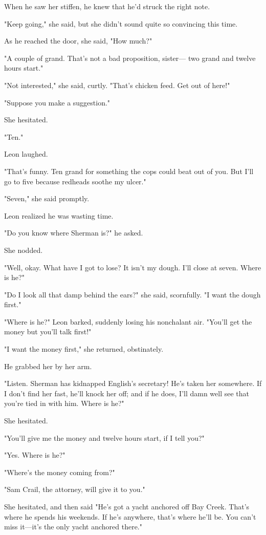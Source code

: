\documentclass{novel}
\begin{document}
When he saw her stiffen, he knew that he'd struck the right note.

"Keep going," she said, but she didn't sound quite so convincing this time.

As he reached the door, she said, "How much?"

"A couple of grand. That's not a bad proposition, sister— two grand and twelve hours start."

"Not interested," she said, curtly. "That's chicken feed. Get out of here!"

"Suppose you make a suggestion."

She hesitated.

"Ten."

Leon laughed.

"That's funny. Ten grand for something the cops could beat out of you. But I'll go to five because redheads soothe my ulcer."

"Seven," she said promptly.

Leon realized he was wasting time.

"Do you know where Sherman is?" he asked.

She nodded.

"Well, okay. What have I got to lose? It isn't my dough. I'll close at seven. Where is he?"

"Do I look all that damp behind the ears?" she said, scornfully. "I want the dough first."

"Where is he?" Leon barked, suddenly losing his nonchalant air. "You'll get the money but you'll talk first!"

"I want the money first," she returned, obstinately.

He grabbed her by her arm.

"Listen. Sherman has kidnapped English's secretary! He's taken her somewhere. If I don't find her fast, he'll knock her off; and if he does, I'll damn well see that you're tied in with him. Where is he?"

She hesitated.

"You'll give me the money and twelve hours start, if I tell you?"

"Yes. Where is he?"

"Where's the money coming from?"

"Sam Crail, the attorney, will give it to you."

She hesitated, and then said "He's got a yacht anchored off Bay Creek. That's where he spends his weekends. If he's anywhere, that's where he'll be. You can't miss it—it's the only yacht anchored there."
\end{document}
